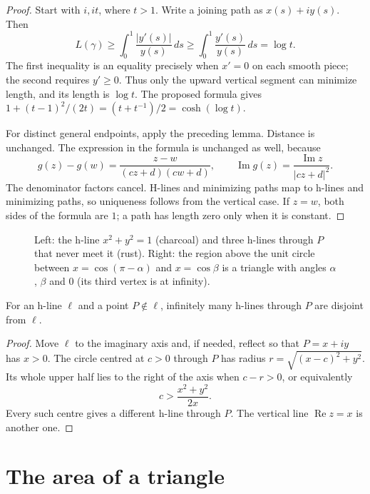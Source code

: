\begin{proof}
Start with $i,it$, where $t>1$. Write a joining path as $x(s)+iy(s)$. Then
\[
L(\gamma)\ge\int_0^1\frac{|y'(s)|}{y(s)}\,ds
\ge\int_0^1\frac{y'(s)}{y(s)}\,ds=\log t.
\]
The first inequality is an equality precisely when $x'=0$ on each smooth piece; the second requires $y'\ge0$. Thus only the upward vertical segment can minimize length, and its length is $\log t$. The proposed formula gives
$1+(t-1)^2/(2t)=(t+t^{-1})/2=\cosh(\log t)$.

For distinct general endpoints, apply the preceding lemma. Distance is unchanged. The expression in the formula is unchanged as well, because
\[
g(z)-g(w)=\frac{z-w}{(cz+d)(cw+d)},
\qquad \operatorname{Im}g(z)=\frac{\operatorname{Im}z}{|cz+d|^2}.
\]
The denominator factors cancel. H-lines and minimizing paths map to h-lines and minimizing paths, so uniqueness follows from the vertical case. If $z=w$, both sides of the formula are $1$; a path has length zero only when it is constant.
\end{proof}

\begin{figure}[ht]
\centering
{}
\caption{Left: the h-line $x^2+y^2=1$ (charcoal) and three h-lines through $P$ that never meet it (rust). Right: the region above the unit circle between
$x=\cos(\pi-\alpha)$ and $x=\cos\beta$ is a triangle with angles $\alpha$, $\beta$ and $0$ (its third vertex is at infinity).}
\label{geometry:fig:halfplane}
\end{figure}

\begin{proposition}\label{geometry:prop:parallels}
For an h-line $\ell$ and a point $P\notin\ell$, infinitely many h-lines through $P$ are disjoint from $\ell$.
\end{proposition}

\begin{proof}
Move $\ell$ to the imaginary axis and, if needed, reflect so that $P=x+iy$ has $x>0$. The circle centred at $c>0$ through $P$ has radius $r=\sqrt{(x-c)^2+y^2}$. Its whole upper half lies to the right of the axis when $c-r>0$, or equivalently
\[
c>\frac{x^2+y^2}{2x}.
\]
Every such centre gives a different h-line through $P$. The vertical line $\operatorname{Re}z=x$ is another one.
\end{proof}

\section{The area of a triangle}

